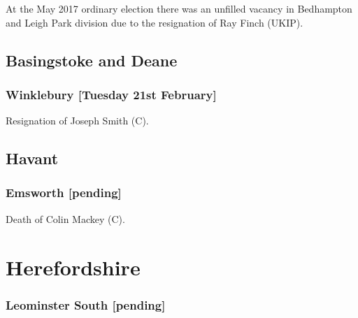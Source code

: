 \documentclass[a4paper,openany]{book}
\begin{document}
\begin{resultsiii}
At the May 2017 ordinary election there was an unfilled vacancy in Bedhampton and Leigh Park division due to the resignation of Ray Finch (UKIP).

\subsection*{Basingstoke and Deane}

\subsubsection*{Winklebury \hspace*{\fill}\nolinebreak[1]%
\enspace\hspace*{\fill}
[Tuesday 21st February]}


Resignation of Joseph Smith (C).

\subsection*{Havant}

\subsubsection*{Emsworth \hspace*{\fill}\nolinebreak[1]%
\enspace\hspace*{\fill}
[pending]}


Death of Colin Mackey (C).

\section{Herefordshire}

\subsubsection*{Leominster South \hspace*{\fill}\nolinebreak[1]%
\enspace\hspace*{\fill}
[pending]}



\end{resultsiii}
\end{document}
